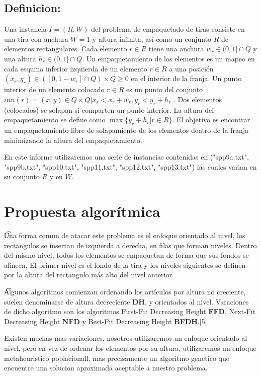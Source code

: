 \documentclass[10pt]{article}
\begin{document}
\subsection{Definicion:}
Una instancia $ I = (R,W)$  del problema de empaquetado de tiras consiste en una tira con anchura $W = 1$ y altura infinita, así como un conjunto $R$  de elementos rectangulares. Cada elemento $r   \in   R$ tiene una anchura  $w_r \in  (0,1]  \cap  Q $ y una altura  $h_r     \in   (0,1] \cap Q $. Un empaquetamiento de los elementos es un mapeo en cada esquina inferior izquierda de un elemento $r    \in   R$  a una posición $(x_r,y_r) \in([0,1 - w_r] \cap Q) \times Q\geq 0$ en el interior de la franja. 
Un punto interior de un elemento colocado $ r \in  R $ es un punto del conjunto $inn(r)={(x,y) \in Q\times Q | x_r < x_r + w_r , y_r<y_r+h_r}$ .
Dos elementos (colocados) se solapan si comparten un punto interior. La altura del empaquetamiento se define como $ \max \{ y_r + h_r | r \in R\} $. El objetivo es encontrar un empaquetamiento libre de solapamiento de los elementos dentro de la franja minimizando la altura del empaquetamiento.

 En este informe utilizaremos una serie de instancias 
contenidas en ("spp9a.txt", "spp9b.txt", "spp10.txt", "spp11.txt", "spp12.txt", "spp13.txt") las cuales varian en su conjunto $R$ y en $W$.

\section{Propuesta algorítmica} %

\t Una forma comun de atacar este problema es el enfoque orientado al nivel, los rectangulos se insertan de izquierda a derecha, en filas que forman niveles. Dentro del mismo nivel, todos los elementos se empaquetan de forma que sus fondos se alineen. El primer nivel es el fondo de la tira y los niveles siguientes se definen por la altura del rectangulo más alto del nivel anterior.
 
\t Algunos algoritmos comienzan ordenando los artículos por altura no creciente, suelen denominarse de altura decreciente \textbf{DH}, y orientados al nivel. Varaciones de dicho algoritmo son los algoritmos First-Fit Decreasing Height \textbf{FFD}, Next-Fit Decreasing Height \textbf{NFD} y Best-Fit Decreasing Height \textbf{BFDH}.[5]

Existen muchas mas variaciones, nosotros utilizaremos un enfoque orientado al nivel, pero en vez de ordenar los elementos por su altura, utilizaremos un enfoque metaheuristico poblacionall, mas precisamente un algoritmo genetico que encuentre una solucion aproximada aceptable a nuestro problema.
\end{document}
